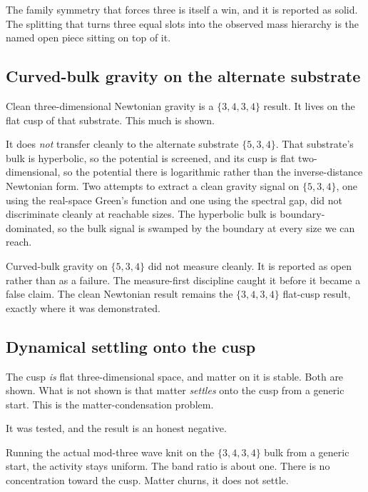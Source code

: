 The family symmetry that forces three is itself a win, and it is reported as solid. The splitting that turns three equal slots into the observed mass hierarchy is the named open piece sitting on top of it.

\subsection{Curved-bulk gravity on the alternate substrate}

Clean three-dimensional Newtonian gravity is a $\{3,4,3,4\}$ result. It lives on the flat cusp of that substrate. This much is shown.

It does \emph{not} transfer cleanly to the alternate substrate $\{5,3,4\}$. That substrate's bulk is hyperbolic, so the potential is screened, and its cusp is flat two-dimensional, so the potential there is logarithmic rather than the inverse-distance Newtonian form. Two attempts to extract a clean gravity signal on $\{5,3,4\}$, one using the real-space Green's function and one using the spectral gap, did not discriminate cleanly at reachable sizes. The hyperbolic bulk is boundary-dominated, so the bulk signal is swamped by the boundary at every size we can reach.

\begin{result}
Curved-bulk gravity on $\{5,3,4\}$ did not measure cleanly. It is reported as open rather than as a failure. The measure-first discipline caught it before it became a false claim. The clean Newtonian result remains the $\{3,4,3,4\}$ flat-cusp result, exactly where it was demonstrated.
\end{result}

\subsection{Dynamical settling onto the cusp}

The cusp \emph{is} flat three-dimensional space, and matter on it is stable. Both are shown. What is not shown is that matter \emph{settles} onto the cusp from a generic start. This is the matter-condensation problem.

It was tested, and the result is an honest negative.

\begin{result}
Running the actual mod-three wave knit on the $\{3,4,3,4\}$ bulk from a generic start, the activity stays uniform. The band ratio is about one. There is no concentration toward the cusp. Matter churns, it does not settle.
\end{result}


